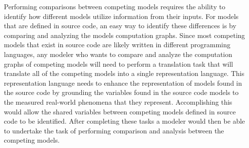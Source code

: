 Performing comparisons between competing models requires the ability to identify how different models utilize information from their inputs.
For models that are defined in source code, an easy way to identify these differences is by comparing and analyzing the models computation graphs.
Since most competing models that exist in source code are likely written in different programming languages, any modeler who wants to compare and analyze the computation graphs of competing models will need to perform a translation task that will translate all of the competing models into a single representation language.
This representation language needs to enhance the representation of models found in the source code by grounding the variables found in the source code models to the measured real-world phenomena that they represent.
Accomplishing this would allow the shared variables between competing models defined in source code to be identified.
After completing these tasks a modeler would then be able to undertake the task of performing comparison and analysis between the competing models.


